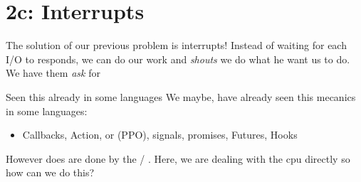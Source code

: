 \section{2c: Interrupts}
The solution of our previous problem is interrupts! Instead of waiting for each I/O to responds, we can do our work and  \textit{shouts} we do what he want us to do. We have them \textit{ask} for \\
\begin{parag}{Seen this already in some languages}
	We maybe, have already seen this mecanics in some languages:
	\begin{itemize}
	    \item Callbacks, Action, or  (PPO), signals, promises, Futures, Hooks
	\end{itemize}
	However does are done by the / . Here, we are dealing with the cpu directly so how can we do this?
\end{parag}
